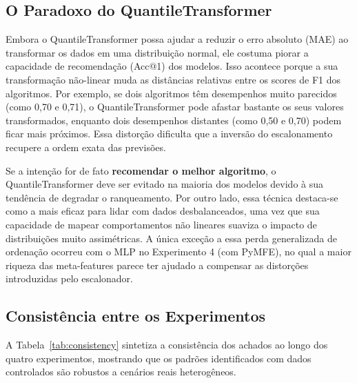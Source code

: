\documentclass[12pt]{article}
\begin{document}
\subsection{O Paradoxo do QuantileTransformer}

Embora o QuantileTransformer possa ajudar a reduzir o erro absoluto (MAE) ao transformar os dados em uma distribuição normal, ele costuma piorar a capacidade de recomendação (Acc@1) dos modelos. Isso acontece porque a sua transformação não-linear muda as distâncias relativas entre os scores de F1 dos algoritmos. Por exemplo, se dois algoritmos têm desempenhos muito parecidos (como 0,70 e 0,71), o QuantileTransformer pode afastar bastante os seus valores transformados, enquanto dois desempenhos distantes (como 0,50 e 0,70) podem ficar mais próximos. Essa distorção dificulta que a inversão do escalonamento recupere a ordem exata das previsões.

Se a intenção for de fato \textbf{recomendar o melhor algoritmo}, o QuantileTransformer deve ser evitado na maioria dos modelos devido à sua tendência de degradar o ranqueamento. Por outro lado, essa técnica destaca-se como a mais eficaz para lidar com dados desbalanceados, uma vez que sua capacidade de mapear comportamentos não lineares suaviza o impacto de distribuições muito assimétricas. A única exceção a essa perda generalizada de ordenação ocorreu com o MLP no Experimento 4 (com PyMFE), no qual a maior riqueza das meta-features parece ter ajudado a compensar as distorções introduzidas pelo escalonador.

\subsection{Consistência entre os Experimentos}

A Tabela~\ref{tab:consistency} sintetiza a consistência dos achados ao longo dos quatro experimentos, mostrando que os padrões identificados com dados controlados são robustos a cenários reais heterogêneos.
\end{document}
